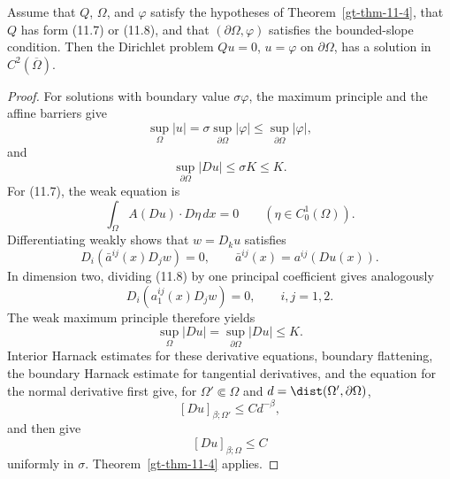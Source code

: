\begin{theorem}
\label{gt-thm-11-5}
Assume that $Q$, $\Omega$, and $\varphi$ satisfy the hypotheses of
Theorem~\ref{gt-thm-11-4}, that $Q$ has form (11.7) or (11.8), and that
$(\partial\Omega,\varphi)$ satisfies the bounded-slope condition. Then the
Dirichlet problem $Qu=0$, $u=\varphi$ on $\partial\Omega$, has a solution in
$C^2(\overline\Omega)$.
\end{theorem}
\begin{proof}
\sketch For solutions with boundary value $\sigma\varphi$, the maximum
principle and the affine barriers give
\begin{equation}
\tag{11.9}
\sup_\Omega|u|=\sigma\sup_{\partial\Omega}|\varphi|
\leq\sup_{\partial\Omega}|\varphi|,
\end{equation}
and
\begin{equation}
\tag{11.10}
\sup_{\partial\Omega}|Du|\leq\sigma K\leq K.
\end{equation}
For (11.7), the weak equation is
\begin{equation}
\tag{11.11}
\int_\Omega A(Du)\cdot D\eta\,dx=0
\qquad(\eta\in C_0^1(\Omega)).
\end{equation}
Differentiating weakly shows that $w=D_ku$ satisfies
\begin{equation}
\tag{11.12}
D_i(\bar a^{ij}(x)D_jw)=0,
\qquad \bar a^{ij}(x)=a^{ij}(Du(x)).
\end{equation}
In dimension two, dividing (11.8) by one principal coefficient gives
analogously
\begin{equation}
\tag{11.14}
D_i(a_1^{ij}(x)D_jw)=0,
\qquad i,j=1,2.
\end{equation}
The weak maximum principle therefore yields
\begin{equation}
\tag{11.13}
\sup_\Omega|Du|=\sup_{\partial\Omega}|Du|\leq K.
\end{equation}
Interior Harnack estimates for these derivative equations, boundary
flattening, the boundary Harnack estimate for tangential derivatives, and the
equation for the normal derivative first give, for
$\Omega'\Subset\Omega$ and $d=\dist(\Omega',\partial\Omega)$,
\begin{equation}
\tag{11.15}
[Du]_{\beta;\Omega'}\leq Cd^{-\beta},
\end{equation}
and then give
\begin{equation}
\tag{11.16}
[Du]_{\beta;\Omega}\leq C
\end{equation}
uniformly in $\sigma$. Theorem~\ref{gt-thm-11-4} applies.
\end{proof}

